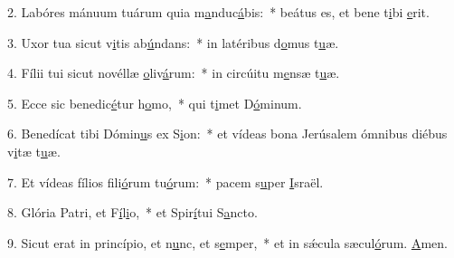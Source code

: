 2. Labóres mánuum tuárum quia m\uline{a}nduc\uline{á}bis:~* beátus es, et bene t\uline{i}bi \uline{e}rit.\par 
3. Uxor tua sicut v\uline{i}tis ab\uline{ú}ndans:~* in latéribus d\uline{o}mus t\uline{u}æ.\par 
4. Fílii tui sicut novéllæ \uline{o}liv\uline{á}rum:~* in circúitu m\uline{e}nsæ t\uline{u}æ.\par 
5. Ecce sic benedic\uline{é}tur h\uline{o}mo,~* qui t\uline{i}met D\uline{ó}minum.\par 
6. Benedícat tibi Dómin\uline{u}s ex S\uline{i}on:~* et vídeas bona Jerúsalem ómnibus diébus v\uline{i}tæ t\uline{u}æ.\par 
7. Et vídeas fílios fili\uline{ó}rum tu\uline{ó}rum:~* pacem s\uline{u}per \uline{I}sraël.\par 
8. Glória Patri, et F\uline{í}l\uline{i}o,~* et Spir\uline{í}tui S\uline{a}ncto.\par 
9. Sicut erat in princípio, et n\uline{u}nc, et s\uline{e}mper,~* et in sǽcula sæcul\uline{ó}rum. \uline{A}men.\par 
